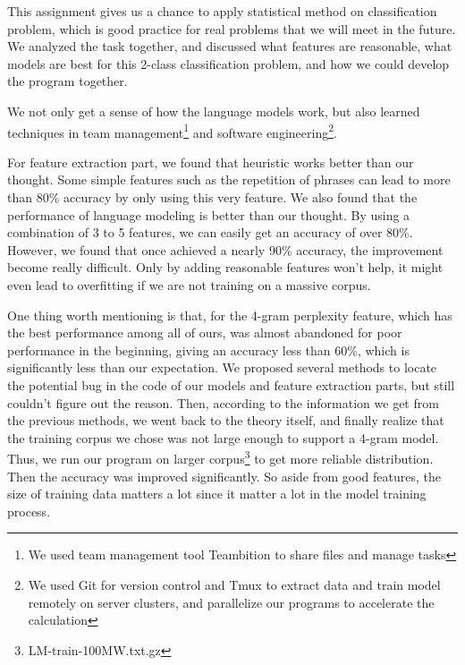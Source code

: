 
This assignment gives us a chance to apply statistical method on classification problem, which is good practice 
for real problems that we will meet in the future. We analyzed the task together, and discussed what features
are reasonable, what models are best for this 2-class classification problem, and how we could develop the 
program together. 

We not only get a sense of how the language models work, but also learned techniques in
team management\footnote{We used team management tool Teambition to share files and manage tasks} 
and software engineering\footnote{We used Git for version control and Tmux to extract data and train model
remotely on server clusters, and parallelize our programs to accelerate the calculation}.

For feature extraction part, we found that heuristic works better than our thought. Some simple features
  such as the repetition of phrases can lead to more than 80\% accuracy by only using this very feature. 
  We also found that the performance of language modeling is better than our thought. By using a combination of
   3 to 5 features, we can easily get an accuracy of over 80\%.
      However, we found that once achieved a nearly 90\% accuracy, the improvement become really difficult. 
   Only by adding reasonable features won't help, it might even lead to overfitting if we are not training on a massive corpus.



One thing worth mentioning is that, for the 4-gram perplexity feature, which has the best performance among
all of ours, was almost abandoned for poor performance in the beginning, giving an accuracy less than 60\%, which 
is significantly less than our expectation. We proposed several methods to locate the potential bug in the code of our models and 
feature extraction parts, but still couldn't figure out the reason. Then, according to the information we get from the previous 
methods, we went back to the theory itself, and finally realize that the training corpus we chose was not large enough to 
support a 4-gram model. Thus, we run our program on larger corpus\footnote{LM-train-100MW.txt.gz} to get more reliable 
distribution. Then the accuracy was improved significantly. So aside from good features, the size of training data matters 
a lot since it matter a lot in the model training process.


